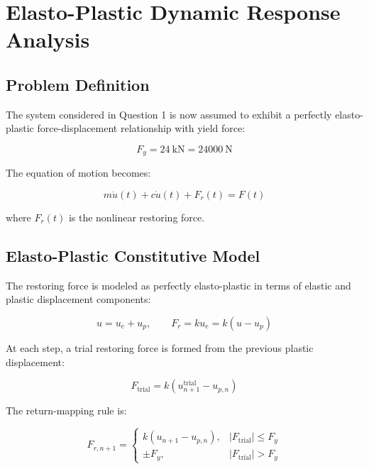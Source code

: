 \section{Elasto-Plastic Dynamic Response Analysis}

\subsection{Problem Definition}

The system considered in Question 1 is now assumed to exhibit a perfectly elasto-plastic force-displacement relationship with yield force:

\begin{equation}
F_y = 24 \ \text{kN} = 24000 \ \text{N}
\end{equation}

The equation of motion becomes:

\begin{equation}
m\ddot{u}(t) + c\dot{u}(t) + F_r(t) = F(t)
\end{equation}

where $F_r(t)$ is the nonlinear restoring force.



\subsection{Elasto-Plastic Constitutive Model}

The restoring force is modeled as perfectly elasto-plastic in terms of elastic and plastic displacement components:

\begin{equation}
u = u_e + u_p, \qquad F_r = k u_e = k(u-u_p)
\end{equation}

At each step, a trial restoring force is formed from the previous plastic displacement:

\begin{equation}
F_{\text{trial}} = k\left(u_{n+1}^{\text{trial}} - u_{p,n}\right)
\end{equation}

The return-mapping rule is:

\begin{equation}
F_{r,n+1} =
\begin{cases}
k\left(u_{n+1} - u_{p,n}\right), & |F_{\text{trial}}| \leq F_y \\
\pm F_y, & |F_{\text{trial}}| > F_y
\end{cases}
\end{equation}

